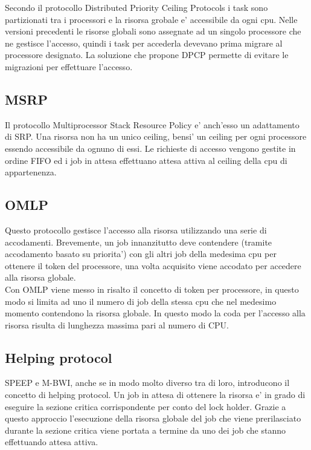 \documentclass[a4paper,11pt]{article}
\begin{document}
\noindent Secondo il protocollo Distributed Priority Ceiling Protocols i task sono partizionati tra i processori e la risorsa grobale e' accessibile da ogni cpu. Nelle versioni precedenti le risorse globali sono assegnate ad un singolo processore che ne gestisce l'accesso, quindi i task per accederla devevano prima migrare al processore designato. La soluzione che propone DPCP permette di evitare le migrazioni per effettuare l'accesso.\\

\subsection{MSRP}

\noindent Il protocollo Multiprocessor Stack Resource Policy e' anch'esso un adattamento di SRP. Una risorsa non ha un unico ceiling, bensi' un ceiling per ogni processore essendo accessibile da ognuno di essi. Le richieste di accesso vengono gestite in ordine FIFO ed i job in attesa effettuano attesa attiva al ceiling della cpu di appartenenza.\\

\subsection{OMLP} 

\noindent Questo protocollo gestisce l'accesso alla risorsa utilizzando una serie di accodamenti. Brevemente, un job innanzitutto deve contendere (tramite accodamento basato su priorita') con gli altri job della medesima cpu per ottenere il token del processore, una volta acquisito viene accodato per accedere alla risorsa globale.\\

\noindent Con OMLP viene messo in risalto il concetto di token per processore, in questo modo si limita ad uno il numero di job della stessa cpu che nel medesimo momento contendono la risorsa globale. In questo modo la coda per l'accesso alla risorsa risulta di lunghezza massima pari al numero di CPU.\\

\subsection{Helping protocol}

\noindent SPEEP e M-BWI, anche se in modo molto diverso tra di loro, introducono il concetto di helping protocol. Un job in attesa di ottenere la risorsa e' in grado di eseguire la sezione critica corrispondente per conto del lock holder. Grazie a questo approccio l'esecuzione della risorsa globale del job che viene prerilasciato durante la sezione critica viene portata a termine da uno dei job che stanno effettuando attesa attiva.\\
\end{document}
